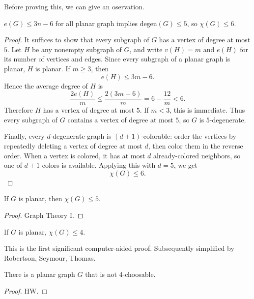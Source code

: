 Before proving this, we can give an oservation.

\begin{observation}
    \(e(G) \le 3 n - 6\) for all planar graph implies \(\mathrm{degen}(G) \le 5\), so \(\chi (G) \le 6\).   
\end{observation}

\begin{proof}
It suffices to show that every subgraph of \(G\) has a vertex of degree at most \(5\).
Let \(H\) be any nonempty subgraph of \(G\), and write \(v(H)=m\) and \(e(H)\) for its number of vertices and edges.
Since every subgraph of a planar graph is planar, \(H\) is planar. If \(m\ge 3\), then
\[
    e(H) \le 3m-6.
\]
Hence the average degree of \(H\) is
\[
    \frac{2e(H)}{m} \le \frac{2(3m-6)}{m} = 6-\frac{12}{m} < 6.
\]
Therefore \(H\) has a vertex of degree at most \(5\). If \(m<3\), this is immediate.
Thus every subgraph of \(G\) contains a vertex of degree at most \(5\), so \(G\) is \(5\)-degenerate.

Finally, every \(d\)-degenerate graph is \((d+1)\)-colorable: order the vertices by repeatedly deleting a vertex of degree at most \(d\), then color them in the reverse order. When a vertex is colored, it has at most \(d\) already-colored neighbors, so one of \(d+1\) colors is available. Applying this with \(d=5\), we get
\[
    \chi(G) \le 6.
\]
\end{proof}

\begin{theorem}[Heawood, 1890]
    If \(G\) is planar, then \(\chi (G) \le 5\).  
\end{theorem}
\begin{proof}
    Graph Theory I. 
\end{proof}

\begin{theorem}
    If \(G\) is planar, \(\chi (G) \le 4\).   
\end{theorem}

\begin{remark}
    This is the first significant computer-aided proof. Subsequently simplified by Robertson, Seymour, Thomas.
\end{remark}

\begin{proposition}
    There is a planar graph \(G\) that is not 4-choosable. 
\end{proposition}
\begin{proof}
    HW.
\end{proof}

